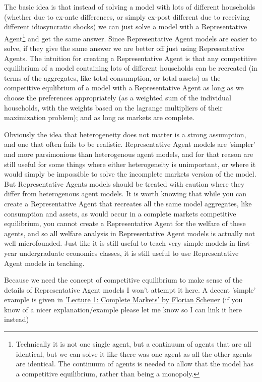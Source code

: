 The basic idea is that instead of solving a model with lots of different households (whether due to ex-ante differences, or simply ex-post different due to receiving different idiosyncratic shocks) we can just solve a model with a Representative Agent\footnote{Technically it is not one single agent, but a continuum of agents that are all identical, but we can solve it like there was one agent as all the other agents are identical. The continuum of agents is needed to allow that the model has a competitive equilibrium, rather than being a monopoly.} and get the same answer. Since Representative Agent models are easier to solve, if they give the same answer we are better off just using Representative Agents. The intuition for creating a Representative Agent is that any competitive equilibrium of a model containing lots of different households can be recreated (in terms of the aggregates, like total consumption, or total assets) as the competitive equlibrium of a model with a Representative Agent as long as we choose the preferences appropriately (as a weighted sum of the individual households, with the weights based on the lagrange multipliers of their maximization problem); and as long as markets are complete.

Obviously the idea that heterogeneity does not matter is a strong assumption, and one that often fails to be realistic. Representative Agent models are 'simpler' and more parsimonious than heterogenous agent models, and for that reason are still useful for some things where either heterogeneity is unimportant, or where it would simply be impossible to solve the incomplete markets version of the model. But Representative Agents models should be treated with caution where they differ from heterogenous agent models. It is worth knowing that while you can create a Representative Agent that recreates all the same model aggregates, like consumption and assets, as would occur in a complete markets competitive equilibrium, you cannot create a Representative Agent for the welfare of these agents, and so all welfare analysis in Representative Agent models is actually not well microfounded. Just like it is still useful to teach very simple models in first-year undergraduate economics classes, it is still useful to use Representative Agent models in teaching.

Because we need the concept of competitive equilibrium to make sense of the details of Representative Agent models I won't attempt it here. A decent 'simple' example is given in \href{https://www.econ.uzh.ch/dam/jcr:9fa05862-891f-4004-aa7c-ca74980f746c/1\%20-\%20Endowment\%20Economy.pdf}{'Lecture 1: Complete Markets' by Florian Scheuer} (if you know of a nicer explanation/example please let me know so I can link it here instead)











